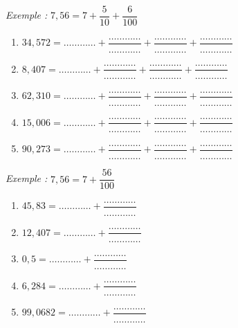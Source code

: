 \documentclass[11pt]{article}
\begin{document}
\begin{exercicedevoir}
\textit{Exemple :} $7,56 = 7 + \dfrac{5}{10} +\dfrac{6}{100}$
\begin{enumerate}
\item $34,572=\ldots\ldots\ldots\ldots+\dfrac{\ldots\ldots\ldots\ldots}{\ldots\ldots\ldots\ldots}+\dfrac{\ldots\ldots\ldots\ldots}{\ldots\ldots\ldots\ldots}+\dfrac{\ldots\ldots\ldots\ldots}{\ldots\ldots\ldots\ldots}$
\item $8,407=\ldots\ldots\ldots\ldots+\dfrac{\ldots\ldots\ldots\ldots}{\ldots\ldots\ldots\ldots}+\dfrac{\ldots\ldots\ldots\ldots}{\ldots\ldots\ldots\ldots}+\dfrac{\ldots\ldots\ldots\ldots}{\ldots\ldots\ldots\ldots}$
\item $62,310=\ldots\ldots\ldots\ldots+\dfrac{\ldots\ldots\ldots\ldots}{\ldots\ldots\ldots\ldots}+\dfrac{\ldots\ldots\ldots\ldots}{\ldots\ldots\ldots\ldots}+\dfrac{\ldots\ldots\ldots\ldots}{\ldots\ldots\ldots\ldots}$
\item $15,006=\ldots\ldots\ldots\ldots+\dfrac{\ldots\ldots\ldots\ldots}{\ldots\ldots\ldots\ldots}+\dfrac{\ldots\ldots\ldots\ldots}{\ldots\ldots\ldots\ldots}+\dfrac{\ldots\ldots\ldots\ldots}{\ldots\ldots\ldots\ldots}$
\item $90,273=\ldots\ldots\ldots\ldots+\dfrac{\ldots\ldots\ldots\ldots}{\ldots\ldots\ldots\ldots}+\dfrac{\ldots\ldots\ldots\ldots}{\ldots\ldots\ldots\ldots}+\dfrac{\ldots\ldots\ldots\ldots}{\ldots\ldots\ldots\ldots}$
\end{enumerate}
\end{exercicedevoir}

\begin{exercicedevoir}
\textit{Exemple :} $7,56 = 7 + \dfrac{56}{100}$
\begin{enumerate}
\item $45,83=\ldots\ldots\ldots\ldots+\dfrac{\ldots\ldots\ldots\ldots}{\ldots\ldots\ldots\ldots}$
\item $12,407=\ldots\ldots\ldots\ldots+\dfrac{\ldots\ldots\ldots\ldots}{\ldots\ldots\ldots\ldots}$
\item $0,5=\ldots\ldots\ldots\ldots+\dfrac{\ldots\ldots\ldots\ldots}{\ldots\ldots\ldots\ldots}$
\item $6,284=\ldots\ldots\ldots\ldots+\dfrac{\ldots\ldots\ldots\ldots}{\ldots\ldots\ldots\ldots}$
\item $99,0682=\ldots\ldots\ldots\ldots+\dfrac{\ldots\ldots\ldots\ldots}{\ldots\ldots\ldots\ldots}$
\end{enumerate}
\end{exercicedevoir}
\end{document}
